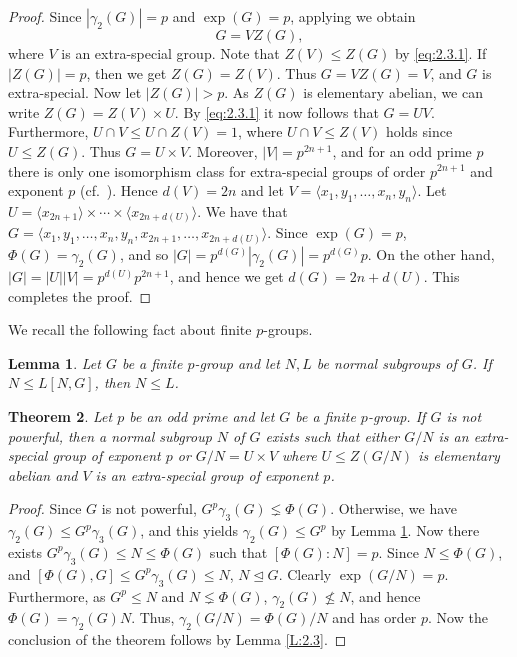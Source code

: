 \documentclass[preprint,sort&compress,12pt]{elsarticle}
\newtheorem{theorem}{Theorem}[section]
\newtheorem{lemma}[theorem]{Lemma}
\theoremstyle{definition}
\numberwithin{equation}{theorem}
\begin{document}
\begin{proof}
Since $|\gamma_2(G)|=p$ and $\exp(G)=p$, applying \cite[Lemma 4.2]{Ber1} we obtain
\begin{equation}\label{eq:2.3.1}
G=VZ(G),
\end{equation}
\noindent where $V$ is an extra-special group. Note that $Z(V)\le Z(G)$ by \eqref{eq:2.3.1}. If $|Z(G)|=p$, then we get $Z(G)=Z(V)$. Thus $G=VZ(G)=V$, and $G$ is extra-special. Now let $|Z(G)| >p$. As $Z(G)$ is elementary abelian, we can write $Z(G)= Z(V)\times U$. By \eqref{eq:2.3.1} it now follows that $G=UV$. Furthermore, $U\cap V\le U\cap Z(V)=1$, where $U\cap V\le Z(V)$ holds since $U\le Z(G)$. Thus $G=U\times V$. Moreover, $|V|=p^{2n+1}$, and for an odd prime $p$ there is only one isomorphism class for extra-special groups of order $p^{2n+1}$ and exponent $p$ (cf.\ \cite[p.\ 34]{GM}). Hence $d(V)=2n$ and let $V=\langle x_1, y_1, \ldots, x_n, y_n\rangle$. Let $U=\langle x_{2n+1}\rangle\times\cdots\times\langle x_{2n+d(U)}\rangle$. We have that $G=\langle x_1, y_1, \ldots, x_n, y_n, x_{2n+1}, \ldots, x_{2n+d(U)}\rangle$. Since $\exp(G)=p$, $\Phi(G)=\gamma_2(G)$, and so $|G|=p^{d(G)}|\gamma_2(G)|=p^{d(G)}p$. On the other hand, $|G|=|U||V|=p^{d(U)}p^{2n+1}$, and hence we get $d(G)=2n+d(U)$. This completes the proof. 
\end{proof}

We recall the following fact about finite $p$-groups.
\begin{lemma}\label{L:2.4}
Let $G$ be a finite $p$-group and let $N, L$ be normal subgroups of $G$. If $N\le L[N, G]$, then $N\le L$.
\end{lemma}

\begin{theorem}\label{th:2.5}
Let $p$ be an odd prime and let $G$ be a finite $p$-group. If $G$ is not powerful, then a normal subgroup $N$ of $G$ exists such that either $G/N$ is an extra-special group of exponent $p$ or $G/N=U\times V$ where $U\le Z(G/N)$ is elementary abelian and $V$ is an extra-special group of exponent $p$.
\end{theorem}

\begin{proof}
Since $G$ is not powerful, $G^p\gamma_3(G)\lneq \Phi(G)$. Otherwise, we have $\gamma_2(G)\le G^p\gamma_3(G)$, and this yields $\gamma_2(G)\le G^p$ by Lemma \ref{L:2.4}. Now there exists $G^p\gamma_3(G)\le N\le \Phi(G)$ such that $[\Phi(G):N]=p$. Since $N\le \Phi(G)$, and $[\Phi(G), G]\le G^p\gamma_3(G)\le N$, $N\unlhd G$. Clearly $\exp(G/N)=p$. Furthermore, as $G^p\le N$ and $N\lneq \Phi(G)$, $\gamma_2(G)\nleq N$, and hence $\Phi(G)=\gamma_2(G)N$. Thus, $\gamma_2(G/N)= \Phi(G)/N$ and has order $p$. Now the conclusion of the theorem follows by Lemma \ref{L:2.3}.
\end{proof}
\end{document}
